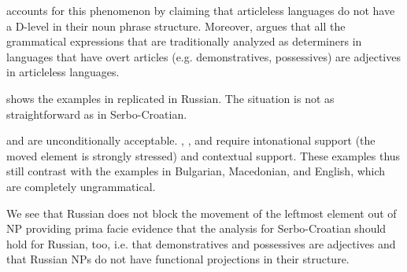 \documentclass[output=paper]{langscibook}
\begin{document}
\noindent \citet{Boskovic2005a} accounts for this phenomenon by claiming that articleless languages do not have a D-level in their noun phrase structure. Moreover, \citeauthor{Boskovic2005a} argues that all the grammatical expressions that are traditionally analyzed as determiners in languages that have overt articles (e.g. demonstratives, possessives) are adjectives in articleless languages.

 shows the examples in  replicated in Russian. The situation is not as straightforward as in Serbo-Croatian.


\ea\label{Russian}      %
\z\z

\noindent {} and  are unconditionally acceptable. , , and  require intonational support (the moved element is strongly stressed) and contextual support. These examples thus still contrast with the examples in Bulgarian, Macedonian, and English, which are completely ungrammatical. 

We see that Russian does not block the movement of the leftmost element out of NP providing prima facie evidence that the analysis for Serbo-Croatian should hold for Russian, too, i.e. that demonstratives and possessives are adjectives and that Russian NPs do not have functional projections in their structure.
\end{document}
